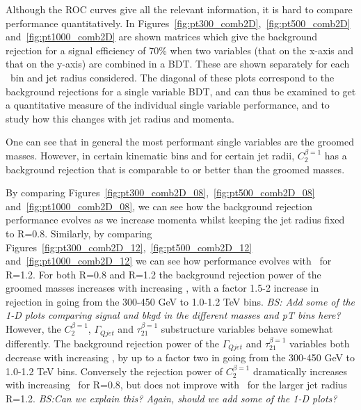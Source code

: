 Although the ROC curves give all the relevant information, it is hard
to compare performance quantitatively. In
Figures~\ref{fig:pt300_comb2D},~\ref{fig:pt500_comb2D}
and~\ref{fig:pt1000_comb2D} are shown matrices which give the
background rejection for a signal efficiency of 70\% when two
variables (that on the x-axis and that on the y-axis) are combined in
a BDT. These are shown separately for each \pt~bin and jet radius
considered. The diagonal of these plots correspond to the background
rejections for a single variable BDT, and can thus be examined to get a
quantitative measure of the individual single variable performance,
and to study how this changes with jet radius and momenta.

One can see that in general the most performant single variables are
the groomed masses. However, in certain kinematic bins and for certain
jet radii, $C_2^{\beta=1}$ has a background rejection that is
comparable to or better than the groomed masses. 

By comparing
Figures~\ref{fig:pt300_comb2D_08},~\ref{fig:pt500_comb2D_08}
and~\ref{fig:pt1000_comb2D_08}, we can see how the background
rejection performance evolves as we increase momenta whilst keeping the jet
radius fixed to R=0.8. Similarly, by comparing Figures~\ref{fig:pt300_comb2D_12},~\ref{fig:pt500_comb2D_12}
and~\ref{fig:pt1000_comb2D_12} we can see how performance evolves with
\pt~for R=1.2. For both R=0.8 and R=1.2 the background rejection power of
the groomed masses increases with increasing \pt, with a factor 1.5-2 increase in rejection in going from the 300-450 GeV to
1.0-1.2 TeV bins. {\it BS: Add some of the 1-D plots comparing signal and bkgd
  in the different masses and pT bins here?} However, the $C_2^{\beta=1}$, $\Gamma_{Qjet}$ and
$\tau_{21}^{\beta=1}$ substructure variables behave somewhat
differently. The background rejection power of the $\Gamma_{Qjet}$ and
$\tau_{21}^{\beta=1}$ variables both decrease with increasing \pt, by
up to a factor two in going from the 300-450 GeV to
1.0-1.2 TeV bins. Conversely the rejection power of $C_2^{\beta=1}$
dramatically increases with increasing \pt~for R=0.8, but does not
improve with \pt~for the larger jet radius R=1.2. {\it BS:Can we
  explain this? Again, should we add some of the 1-D plots?}

